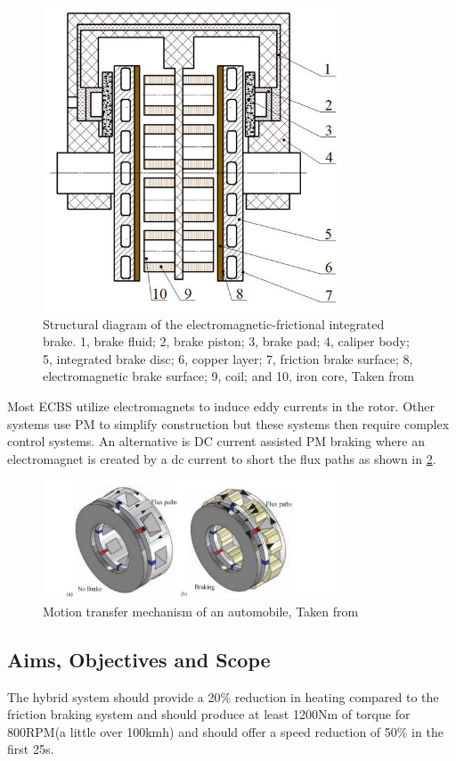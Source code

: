 \documentclass[lettersize,journal]{IEEEtran}
\begin{document}
\begin{figure}[!t]
\centering
\includegraphics[width=3.5in]{images/fig2.png}
\caption{Structural diagram of the electromagnetic-frictional integrated brake. 1, brake fluid; 2, brake piston; 3, brake pad; 4, caliper body; 5, integrated brake disc; 6, copper layer; 7, friction brake surface; 8, electromagnetic brake surface; 9, coil; and 10, iron core, Taken from \cite{wang_2019_performances}}
\label{fig2}
\end{figure}
Most ECBS \cite{putra_2021_mini,gulec_2016_design,shi_2013_study,shi_2013_study} utilize electromagnets to induce eddy currents in the rotor. Other systems use PM \cite{fontchastagner_2017_axialfield,fontchastagner_2018_design,shin_2013_analytical}to simplify construction but these systems then require complex control systems. An alternative is DC current assisted PM braking where an electromagnet is created by a dc current to short the flux paths as shown in \ref{fig3}. 
\begin{figure}[!t]
\centering
\includegraphics[width=3.5in]{images/fig3.png}
\caption{Motion transfer mechanism of an automobile, Taken from \cite{takawane_2019_car}}
\label{fig3}
\end{figure}

\subsection{Aims, Objectives and Scope}
The hybrid system should provide a 20\% reduction in heating compared to the friction braking system and should produce at least 1200Nm of torque for 800RPM(a little over 100kmh) and should offer a speed reduction of 50\% in the first 25s.
\end{document}
